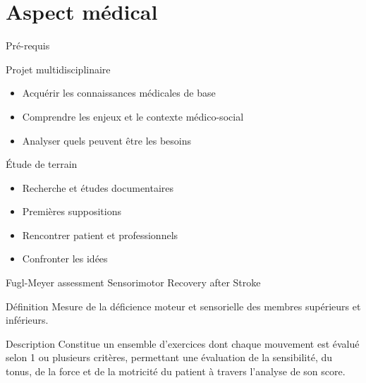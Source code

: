 \section{Aspect médical}

\begin{frame}
\end{frame}

\begin{frame}{Pré-requis}
	\begin{block}{Projet multidisciplinaire}
		\begin{itemize}
			\item Acquérir les connaissances médicales de base  \pause
			\item Comprendre les enjeux et le contexte médico-social  \pause
			\item Analyser quels peuvent être les besoins
		\end{itemize}			
	\end{block}  \pause
		\begin{block}{Étude de terrain}
		\begin{itemize}
			\item Recherche et études documentaires  \pause
			\item Premières suppositions   \pause
			\item Rencontrer patient et professionnels  \pause
			\item Confronter les idées
		\end{itemize}			
	\end{block}
\end{frame}

\begin{frame}{Fugl-Meyer assessment Sensorimotor Recovery after Stroke}
	\begin{block}{Définition}
Mesure de la déficience moteur et sensorielle des membres supérieurs et inférieurs.
	\end{block}  \pause
	\begin{block}{Description}
Constitue un ensemble d'exercices dont chaque mouvement est évalué selon 1 ou plusieurs critères, permettant une évaluation de la sensibilité, du tonus, de la force et de la motricité du patient à travers l'analyse de son score.
	\end{block}
\end{frame}

